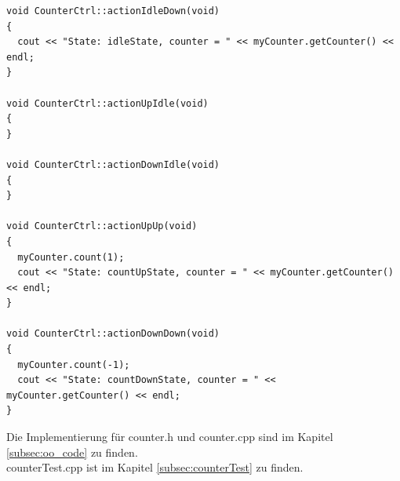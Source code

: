 \begin{lstlisting}[style=Cpp]
void CounterCtrl::actionIdleDown(void)
{
  cout << "State: idleState, counter = " << myCounter.getCounter() << endl;
}

void CounterCtrl::actionUpIdle(void)
{
}

void CounterCtrl::actionDownIdle(void)
{
}

void CounterCtrl::actionUpUp(void)
{
  myCounter.count(1);
  cout << "State: countUpState, counter = " << myCounter.getCounter() << endl;
}

void CounterCtrl::actionDownDown(void)
{
  myCounter.count(-1);
  cout << "State: countDownState, counter = " << myCounter.getCounter() << endl;
}

\end{lstlisting}

Die Implementierung für counter.h und counter.cpp sind im Kapitel \ref{subsec:oo_code} zu finden.\\
counterTest.cpp ist im Kapitel \ref{subsec:counterTest} zu finden.\\

